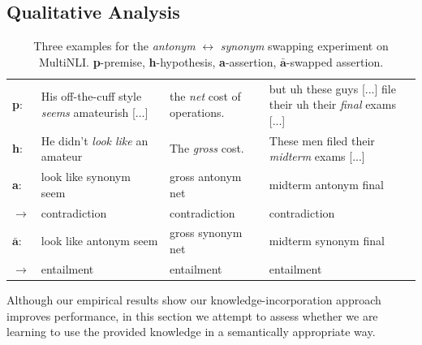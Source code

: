 \documentclass[11pt,a4paper]{article}
\begin{document}
\subsection{Qualitative Analysis}
\label{sec:analysis}

\begin{table}[t]
    \small
    \centering
    \begin{tabular}{l p{} p{2.6cm} p{5.4cm} }
         \toprule
         
         \textbf{p}: &
         His off-the-cuff style \textit{seems} amateurish [...] & 
         the \textit{net} cost of operations. & 
         but uh these guys [...] file their uh their \textit{final} exams [...] \\
         
         \textbf{h}: &
         He didn't \textit{look like} an amateur &
         The \textit{gross} cost. &
         These men filed their \textit{midterm} exams [...] \\
         \midrule
         
         \textbf{a}: &
         look like synonym seem &
         gross antonym net &
         midterm antonym final \\
         
         $\rightarrow$ &
         contradiction &
         contradiction &
         contradiction \\
         \midrule
         
         $\bar{\textbf{a}}$: &
         look like antonym seem &
         gross synonym net &
         midterm synonym final \\
         
         $\rightarrow$ &
         entailment &
         entailment &
         entailment \\
         \bottomrule
    \end{tabular}
    \caption{Three examples for the \textit{antonym} $\leftrightarrow$ \textit{synonym} swapping experiment on MultiNLI. \textbf{p}-premise, \textbf{h}-hypothesis, \textbf{a}-assertion, $\bar{\textbf{a}}$-swapped assertion.}
    \label{tab:examples}
\end{table}

Although our empirical results show our knowledge-incorporation approach improves performance, in this section we attempt to assess whether we are learning to use the provided knowledge in a semantically appropriate way.
\end{document}
